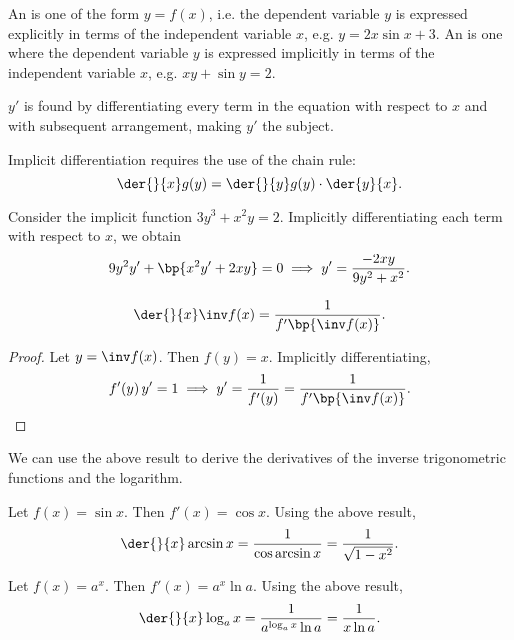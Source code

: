 \begin{definition}
    An  is one of the form $y = f(x)$, i.e. the dependent variable $y$ is expressed explicitly in terms of the independent variable $x$, e.g. $y = 2x \sin x + 3$. An  is one where the dependent variable $y$ is expressed implicitly in terms of the independent variable $x$, e.g. $xy + \sin y = 2$.
\end{definition}

\begin{recipe}
    $y'$ is found by differentiating every term in the equation with respect to $x$ and with subsequent arrangement, making $y'$ the subject.
\end{recipe}

Implicit differentiation requires the use of the chain rule: \[\der{}{x} g(y) = \der{}{y} g(y) \cdot \der{y}{x}.\]

\begin{example}
    Consider the implicit function $3y^3 + x^2 y = 2$. Implicitly differentiating each term with respect to $x$, we obtain \[9y^2 y' + \bp{x^2 y' + 2x y} = 0 \implies y' = \frac{-2xy}{9y^2 + x^2}.\]
\end{example}

\begin{proposition}
    \[\der{}{x} \inv f(x) = \frac1{{f'\bp{\inv f(x)}}}.\]
\end{proposition}
\begin{proof}
    Let $y = \inv f(x)$. Then $f(y) = x$. Implicitly differentiating, \[f'(y) \, y' = 1 \implies y' = \frac1{f'(y)} = \frac1{{f'\bp{\inv f(x)}}}.\]
\end{proof}

We can use the above result to derive the derivatives of the inverse trigonometric functions and the logarithm.

\begin{example}
    Let $f(x) = \sin x$. Then $f'(x) = \cos x$. Using the above result, \[\der{}{x} \arcsin x = \frac{1}{\cos{\arcsin x}} = \frac1{\sqrt{1 - x^2}}.\]
\end{example}

\begin{example}
    Let $f(x) = a^x$. Then $f'(x) = a^x \ln a$. Using the above result, \[\der{}{x} \log_a x = \frac1{a^{\log_a x} \ln a} = \frac1{x \ln a}.\]
\end{example}


